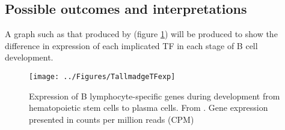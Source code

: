 \documentclass[12pt]{article}
\begin{document}
		
		\subsection{Possible outcomes and interpretations}				
			
			A graph such as that produced by \citet{Tallmadge15} (figure \ref{fig:TallTFexp}) will be produced to show the difference in expression of each implicated TF in each stage of B cell development.
			
				
			
			\begin{figure}
				\centering
				\texttt{[image: ../Figures/TallmadgeTFexp]}
				\caption{Expression of B lymphocyte-specific genes during development from hematopoietic stem cells to plasma cells. From \citet{Tallmadge15}. Gene expression presented in counts per million reads (CPM)}
				\label{fig:TallTFexp}
			\end{figure}
					
%
				
	
	
	
%	
%	
	
	
	
\end{document}
